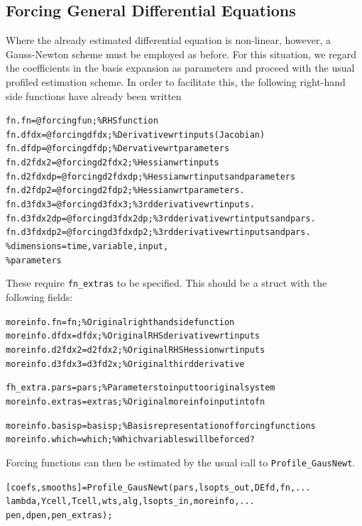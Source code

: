 \documentclass{article}
\newcommand{\nt}    {\noindent}
\begin{document}
\subsection{Forcing General Differential Equations}

Where the already estimated differential equation is non-linear,
however, a Gauss-Newton scheme must be employed as before.
For this situation, we regard the coefficients in the basis
expansion as parameters and proceed with the usual profiled
estimation scheme. In order to facilitate this, the
following right-hand side functions have already been
written

\begin{alltt}
   fn.fn       = @forcingfun;       \% RHS function
   fn.dfdx     = @forcingdfdx;      \% Derivative wrt inputs (Jacobian)
   fn.dfdp     = @forcingdfdp;      \% Dervative wrt parameters
   fn.d2fdx2   = @forcingd2fdx2;    \% Hessian wrt inputs
   fn.d2fdxdp  = @forcingd2fdxdp;   \% Hessian wrt inputs and parameters
   fn.d2fdp2   = @forcingd2fdp2;    \% Hessian wrt parameters.
   fn.d3fdx3   = @forcingd3fdx3;    \% 3rd derivative wrt inputs.
   fn.d3fdx2dp = @forcingd3fdx2dp;  \% 3rd derivative wrt intputs and pars.
   fn.d3fdxdp2 = @forcingd3fdxdp2;  \% 3rd derivative wrt inputs and pars.
                                    \% dimensions = time, variable, input,
                                    \% parameters
\end{alltt}

\nt These require {\tt fn\_extras} to be specified. This
should be a struct with the following fields:

\begin{alltt}
   moreinfo.fn      = fn;      \% Original right hand side function
   moreinfo.dfdx    = dfdx;    \% Original RHS derivative wrt inputs
   moreinfo.d2fdx2  = d2fdx2;  \% Original RHS Hession wrt inputs
   moreinfo.d3fdx3  = d3fd2x;  \% Original third derivative

   fh_extra.pars     = pars;    \% Parameters to input to original system
   moreinfo.extras  = extras;  \% Original moreinfo input into fn

   moreinfo.basisp  = basisp;  \% Basis representation of forcing functions
   moreinfo.which   = which;   \% Which variables will be forced?
\end{alltt}

\nt Forcing functions can then be estimated by the usual
call to {\tt Profile\_GausNewt}.

\begin{alltt}
  [coefs,smooths] = Profile_GausNewt(pars,lsopts_out,DEfd,fn,...
       lambda,Ycell,Tcell,wts,alg,lsopts_in,moreinfo,...
       pen,dpen,pen_extras);
\end{alltt}
\end{document}

